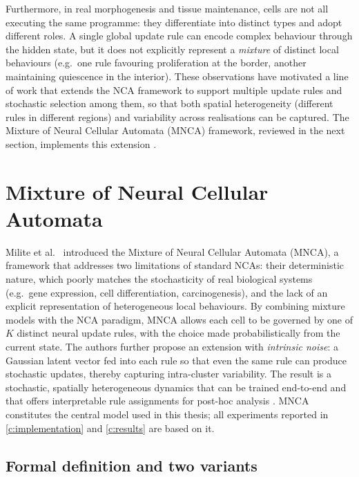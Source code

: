 Furthermore, in real morphogenesis and tissue maintenance, cells are not all executing the same programme: they differentiate into distinct types and adopt different roles. A single global update rule can encode complex behaviour through the hidden state, but it does not explicitly represent a \emph{mixture} of distinct local behaviours (e.g.\ one rule favouring proliferation at the border, another maintaining quiescence in the interior). These observations have motivated a line of work that extends the NCA framework to support multiple update rules and stochastic selection among them, so that both spatial heterogeneity (different rules in different regions) and variability across realisations can be captured. The Mixture of Neural Cellular Automata (MNCA) framework, reviewed in the next section, implements this extension \cite{mnca_milite2025}.

\section{Mixture of Neural Cellular Automata}
\label{sec:sota:mnca}

Milite et al.\ \cite{mnca_milite2025} introduced the Mixture of Neural Cellular Automata (MNCA), a framework that addresses two limitations of standard NCAs: their deterministic nature, which poorly matches the stochasticity of real biological systems (e.g.\ gene expression, cell differentiation, carcinogenesis), and the lack of an explicit representation of heterogeneous local behaviours. By combining mixture models with the NCA paradigm, MNCA allows each cell to be governed by one of \(K\) distinct neural update rules, with the choice made probabilistically from the current state. The authors further propose an extension with \emph{intrinsic noise}: a Gaussian latent vector fed into each rule so that even the same rule can produce stochastic updates, thereby capturing intra-cluster variability. The result is a stochastic, spatially heterogeneous dynamics that can be trained end-to-end and that offers interpretable rule assignments for post-hoc analysis \cite{mnca_milite2025}. MNCA constitutes the central model used in this thesis; all experiments reported in \cref{c:implementation} and \cref{c:results} are based on it.

\subsection{Formal definition and two variants}

